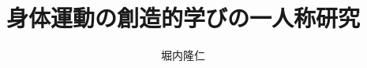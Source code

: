 \documentclass[a4paper,12pt]{jsreport}
\begin{document}
\tableofcontents

\title{身体運動の創造的学びの一人称研究}
\author{堀内隆仁}
\maketitle


% 











% 
% 



\end{document}
